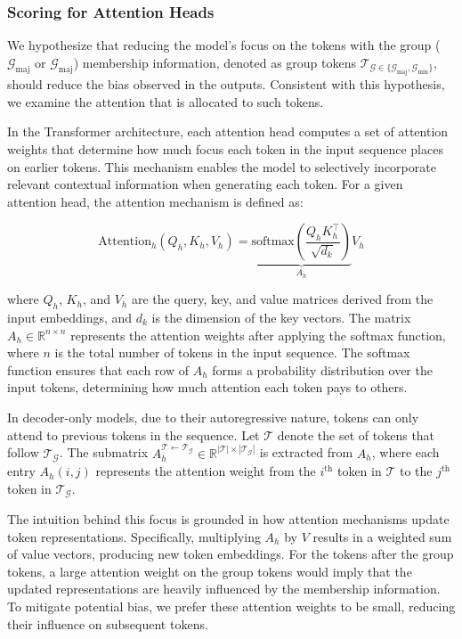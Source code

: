 \subsubsection{Scoring for Attention Heads}

 We hypothesize that reducing the model's focus on the tokens with the group ($\mathcal{G}_{\mathrm{maj}}$ or $\mathcal{G}_{\mathrm{maj}}$) membership information, denoted as group tokens $\mathcal{T}_{\mathcal{G}\in\{\mathcal{G}_{\mathrm{maj}}, \mathcal{G}_{\mathrm{min}}\}}$, should reduce the bias observed in the outputs. Consistent with this hypothesis, we examine the attention that is allocated to such tokens.

In the Transformer architecture, each attention head computes a set of attention weights that determine how much focus each token in the input sequence places on earlier tokens. This mechanism enables the model to selectively incorporate relevant contextual information when generating each token. For a given attention head, the attention mechanism is defined as:


\begin{equation}
    \mathrm{Attention}_h(Q_h, K_h, V_h) = \underbrace{\mathrm{softmax}\left(\frac{Q_hK_h^\top}{\sqrt{d_k}}\right)}_{A_h} V_h
    \label{eq:attn}
\end{equation}


where $Q_h$, $K_h$, and $V_h$ are the query, key, and value matrices derived from the input embeddings, and $d_k$ is the dimension of the key vectors. The matrix $A_h \in \mathbb{R}^{n \times n}$ represents the attention weights after applying the softmax function, where $n$ is the total number of tokens in the input sequence. The softmax function ensures that each row of $A_h$ forms a probability distribution over the input tokens, determining how much attention each token pays to others.

In decoder-only models, due to their autoregressive nature, tokens can only attend to previous tokens in the sequence. Let $\mathcal{T}$ denote the set of tokens that follow $\mathcal{T_G}$. The submatrix $A_h^{\mathcal{T} \leftarrow \mathcal{T_G}} \in \mathbb{R}^{|\mathcal{T}| \times |\mathcal{T_G}|}$ is extracted from $A_h$, where each entry $A_h(i, j)$ represents the attention weight from the $i^\text{th}$ token in $\mathcal{T}$ to the $j^\text{th}$ token in $\mathcal{T_G}$.

The intuition behind this focus is grounded in how attention mechanisms update token representations. Specifically, multiplying $A_h$ by $V$ results in a weighted sum of value vectors, producing new token embeddings. For the tokens after the group tokens, a large attention weight on the group tokens would imply that the updated representations are heavily influenced by the membership information. To mitigate potential bias, we prefer these attention weights to be small, reducing their influence on subsequent tokens.

